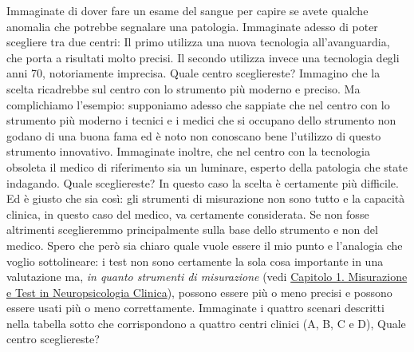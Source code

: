 \documentclass[
  italian,
  letterpaper,
  paper=6in:9in,
  pagesize=pdftex,
  headinclude=on,
  footinclude=on,
  11pt]{scrbook}
\begin{document}
Immaginate di dover fare un esame del sangue per capire se avete qualche
anomalia che potrebbe segnalare una patologia. Immaginate adesso di
poter scegliere tra due centri: Il primo utilizza una nuova tecnologia
all'avanguardia, che porta a risultati molto precisi. Il secondo
utilizza invece una tecnologia degli anni 70, notoriamente imprecisa.
Quale centro scegliereste? Immagino che la scelta ricadrebbe sul centro
con lo strumento più moderno e preciso. Ma complichiamo l'esempio:
supponiamo adesso che sappiate che nel centro con lo strumento più
moderno i tecnici e i medici che si occupano dello strumento non godano
di una buona fama ed è noto non conoscano bene l'utilizzo di questo
strumento innovativo. Immaginate inoltre, che nel centro con la
tecnologia obsoleta il medico di riferimento sia un luminare, esperto
della patologia che state indagando. Quale scegliereste? In questo caso
la scelta è certamente più difficile. Ed è giusto che sia così: gli
strumenti di misurazione non sono tutto e la capacità clinica, in questo
caso del medico, va certamente considerata. Se non fosse altrimenti
sceglieremmo principalmente sulla base dello strumento e non del medico.
Spero che però sia chiaro quale vuole essere il mio punto e l'analogia
che voglio sottolineare: i test non sono certamente la sola cosa
importante in una valutazione ma, \emph{in quanto strumenti di
misurazione} (vedi
\hyperref[misurazione-e-test-in-neuropsicologia-clinica]{Capitolo 1.
Misurazione e Test in Neuropsicologia Clinica}), possono essere più o
meno precisi e possono essere usati più o meno correttamente. Immaginate
i quattro scenari descritti nella tabella sotto che corrispondono a
quattro centri clinici (A, B, C e D), Quale centro scegliereste?
\end{document}
